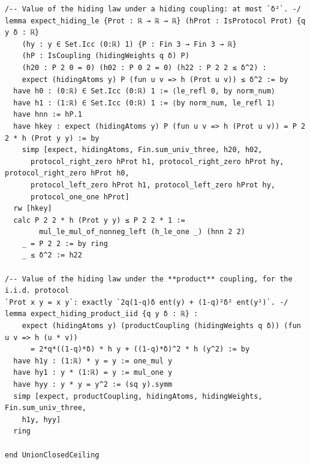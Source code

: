 \documentclass[11pt,a4paper]{article}
\theoremstyle{definition}
\theoremstyle{remark}
\begin{document}
\begin{Verbatim}[fontsize=\scriptsize,formatcom=\leanmono,samepage=false]
/-- Value of the hiding law under a hiding coupling: at most `δ²`. -/
lemma expect_hiding_le {Prot : ℝ → ℝ → ℝ} (hProt : IsProtocol Prot) {q y δ : ℝ}
    (hy : y ∈ Set.Icc (0:ℝ) 1) {P : Fin 3 → Fin 3 → ℝ}
    (hP : IsCoupling (hidingWeights q δ) P)
    (h20 : P 2 0 = 0) (h02 : P 0 2 = 0) (h22 : P 2 2 ≤ δ^2) :
    expect (hidingAtoms y) P (fun u v => h (Prot u v)) ≤ δ^2 := by
  have h0 : (0:ℝ) ∈ Set.Icc (0:ℝ) 1 := ⟨le_refl 0, by norm_num⟩
  have h1 : (1:ℝ) ∈ Set.Icc (0:ℝ) 1 := ⟨by norm_num, le_refl 1⟩
  have hnn := hP.1
  have hkey : expect (hidingAtoms y) P (fun u v => h (Prot u v)) = P 2 2 * h (Prot y y) := by
    simp [expect, hidingAtoms, Fin.sum_univ_three, h20, h02,
      protocol_right_zero hProt h1, protocol_right_zero hProt hy, protocol_right_zero hProt h0,
      protocol_left_zero hProt h1, protocol_left_zero hProt hy,
      protocol_one_one hProt]
  rw [hkey]
  calc P 2 2 * h (Prot y y) ≤ P 2 2 * 1 :=
        mul_le_mul_of_nonneg_left (h_le_one _) (hnn 2 2)
    _ = P 2 2 := by ring
    _ ≤ δ^2 := h22

/-- Value of the hiding law under the **product** coupling, for the i.i.d. protocol
`Prot x y = x y`: exactly `2q(1-q)δ ent(y) + (1-q)²δ² ent(y²)`. -/
lemma expect_hiding_product_iid {q y δ : ℝ} :
    expect (hidingAtoms y) (productCoupling (hidingWeights q δ)) (fun u v => h (u * v))
      = 2*q*((1-q)*δ) * h y + ((1-q)*δ)^2 * h (y^2) := by
  have h1y : (1:ℝ) * y = y := one_mul y
  have hy1 : y * (1:ℝ) = y := mul_one y
  have hyy : y * y = y^2 := (sq y).symm
  simp [expect, productCoupling, hidingAtoms, hidingWeights, Fin.sum_univ_three,
    h1y, hyy]
  ring

end UnionClosedCeiling
\end{Verbatim}
\end{document}
